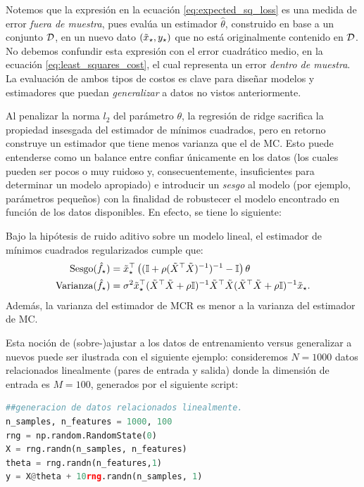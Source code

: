 \begin{mdframed}[style=discusion, frametitle={\center Evaluaciones \emph{dentro de muestra} y \emph{fuera de muestra}}]
 Notemos que la expresión en la ecuación \eqref{eq:expected_sq_loss} es una medida de error \emph{fuera de muestra}, pues evalúa un estimador $\hat\theta$, construido en base a un conjunto ${\mathcal D}$, en un nuevo dato $(\tilde{x}_\star,y_\star)$ que no está originalmente contenido en ${\mathcal D}$. No debemos confundir esta expresión con el error cuadrático medio, en la ecuación \eqref{eq:least_squares_cost}, el cual representa un error \emph{dentro de muestra}. La  evaluación de ambos tipos de  costos es clave para diseñar modelos y estimadores que puedan \emph{generalizar} a datos no vistos anteriormente.
\end{mdframed}

Al penalizar la norma $l_2$ del parámetro $\theta$, la regresión de ridge sacrifica la propiedad insesgada del estimador de mínimos cuadrados, pero en retorno construye un estimador que tiene menos varianza que el de MC. Esto puede entenderse como un balance entre  confiar únicamente en los datos (los cuales pueden ser pocos o muy ruidoso y, consecuentemente, insuficientes para determinar un modelo apropiado) e introducir un \emph{sesgo} al modelo (por ejemplo, parámetros pequeños) con la finalidad de robustecer el modelo encontrado en función de los datos disponibles. En efecto, se tiene lo siguiente:

\begin{theorem} Bajo la hipótesis de ruido aditivo sobre un modelo lineal, el estimador de mínimos cuadrados regularizados cumple que:
	\begin{align}
	\text{Sesgo}(\hat f_\star) & = \tilde{x}_\star^\top \left(({\mathbb I}+\rho(\tilde{X}^\top\tilde{X})^{-1})^{-1}-{\mathbb I}\right)\theta\\
	\text{Varianza}(\hat f_\star) &= \sigma^2 \tilde{x}_\star^\top (\tilde{X}^\top\tilde{X} + \rho{\mathbb I})^{-1}\tilde{X}^\top\tilde{X}(\tilde{X}^\top\tilde{X}+\rho{\mathbb I})^{-1}	\tilde{x}_\star.
\end{align}
Además, la varianza del estimador de MCR es menor a la varianza del estimador de MC.
\end{theorem}

Esta noción de (sobre-)ajustar a los datos de entrenamiento versus generalizar a  nuevos  puede ser ilustrada con el siguiente ejemplo: consideremos $N=1000$ datos relacionados linealmente (pares de entrada y salida) donde la dimensión de entrada es $M=100$, generados por el siguiente script:

\begin{lstlisting}[language=Python]
##generacion de datos relacionados linealmente.
n_samples, n_features = 1000, 100
rng = np.random.RandomState(0)
X = rng.randn(n_samples, n_features)
theta = rng.randn(n_features,1)
y = X@theta + 10rng.randn(n_samples, 1)
\end{lstlisting}

